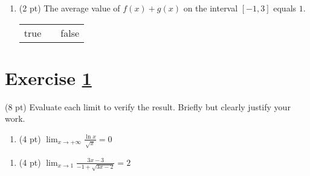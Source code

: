 \begin{enumerate}[resume,label=(\alph*)]
\item\label{itm : Exam4P2Q1e} (2 pt) The average value of $f(x) + g(x)$ on the interval $[-1,3]$ equals $1$.
\begin{center}
\begin{tabular}{c c c}
true	&	\hspace{1in}	&	false
\end{tabular}
\end{center}
\end{enumerate}






%
%
%
%


\newpage

\section{Exercise \ref{sec : Math112 Spring2022 FinalExam P2Q2}}
\label{sec : Math112 Spring2022 FinalExam P2Q2}

(8 pt) Evaluate each limit to verify the result. Briefly but clearly justify your work.

\begin{enumerate}[label=(\alph*)]
\item\label{itm : Exam4P2Q2a} (4 pt) $\displaystyle\lim_{x \rightarrow +\infty} \frac{\ln x}{\sqrt{x}} = 0$
\end{enumerate}

\spaceSolution{3in}{%
}%



%



\begin{enumerate}[resume,label=(\alph*)]
\item\label{itm : Exam4P2Q2c} (4 pt) $\displaystyle\lim_{x \rightarrow 1} \frac{3 x - 3}{-1 + \sqrt{3 x - 2}} = 2$
\end{enumerate}

